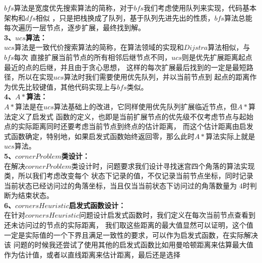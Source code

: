 \documentclass[a4paper,12pt,UTF8]{article}
\begin{document}
\begin{flushleft}
{{    }
    \normalsize{
        \hspace{1cm}$bfs$算法是宽度优先搜索算法的简称，对于$bfs$我们考虑使用队列来实现，代码基本架构和$dfs$相似
        ，只是把栈换成了队列，基于队列先进先出的性质，$bfs$算法总能每次遍历一层节点，逐步扩展，最终找到解。\\
    }
    \large{
        \hspace{1cm}\textbf{3、$ucs$算法：\\}
    }
    \normalsize{
        \hspace{1cm}$ucs$算法是一致代价搜索算法的简称，在算法领域的实现和$Dijstra$算法相似，与$bfs$每次
        直接扩展当前节点的所有相邻后继节点不同，$ucs$则是优先扩展距离起点最近的点的后继，并且由于贪心思想，
        这样的每次扩展最后找到的一定是最短路径，所以在实现$ucs$算法时我们需要使用优先队列，并以当前节点到
        起点的距离作为优先比较键值，其他代码实现上与$bfs$类似。\\
    }
    \large{
        \hspace{1cm}\textbf{4、$A*$算法：\\}
    }
    \normalsize{
        \hspace{1cm}$A*$算法是在$ucs$算法基础上的改进，它同样使用优先队列扩展临近节点，但$A*$算法定义了启发式
        函数的定义，也即是当前扩展节点的优先级不仅考虑节点与起始点的实际距离同时还要考虑当前节点到终点的估计距离，
        而这个估计距离由启发式函数确定，特别地，如果启发式函数始终返回零，那么此时$A*$算法实际上就是$ucs$算法。\\
    }
    \large{
        \hspace{1cm}\textbf{5、$cornerProblem$类设计：\\}
    }
    \normalsize{
        \hspace{1cm}在解决$cornerProblem$类设计时，问题要求我们设计寻找迷宫四个角落的算法实现类，所以我们考虑改变每个
        状态下记录的值，不仅记录当前节点坐标，同时记录当前状态已经访问过的角落坐标，当且仅当当前状态下访问过的角落数量为
        4时判断为结束状态。\\
    }
    \large{
        \hspace{1cm}\textbf{6、$cornersHeuristic$启发式函数设计：\\}
    }
    \normalsize{
        \hspace{1cm}在针对$cornersHeuristic$问题设计启发式函数时，我们定义在每次当前节点查看到还未访问过的节点的实际距离，
        我们取这些距离的最大值显然可以证明，这个值一定是实际值的一个下界且满足一致性的要求，可以作为启发式函数，在实际解决该
        问题的时候我还尝试了使用其他的启发式函数比如用曼哈顿距离来估算最大值作为估计值，或者以直线距离来估计距离，最后还是选择
}}
\end{flushleft}
\end{document}
